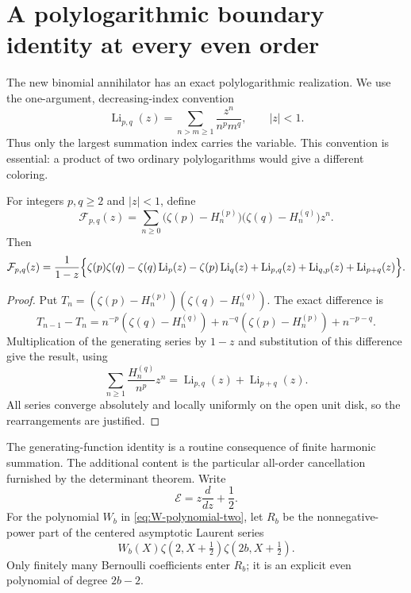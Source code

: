 \section{A polylogarithmic boundary identity at every even order}
\label{sec:polylog-companion}

The new binomial annihilator has an exact polylogarithmic realization.
We use the one-argument, decreasing-index convention
\[
 \operatorname{Li}_{p,q}(z)=\sum_{n>m\ge1}\frac{z^n}{n^p m^q},
 \qquad |z|<1.
\]
Thus only the largest summation index carries the variable. This
convention is essential: a product of two ordinary polylogarithms
would give a different coloring.

\begin{proposition}
\label{prop:two-tail-polylog}
For integers $p,q\ge2$ and $|z|<1$, define
\[
 \mathcal F_{p,q}(z)=\sum_{n\ge0}
       \bigl(\zeta(p)-H_n^{(p)}\bigr)
       \bigl(\zeta(q)-H_n^{(q)}\bigr)z^n.
\]
Then
\begin{equation}\label{eq:two-tail-polylog}
 \mathcal F_{p,q}(z)=\frac{1}{1-z}\Bigl\{
 \zeta(p)\zeta(q)-\zeta(q)\operatorname{Li}_p(z)
 -\zeta(p)\operatorname{Li}_q(z)
 +\operatorname{Li}_{p,q}(z)+\operatorname{Li}_{q,p}(z)
 +\operatorname{Li}_{p+q}(z)\Bigr\}.
\end{equation}
\end{proposition}
\begin{proof}
Put $T_n=(\zeta(p)-H_n^{(p)})(\zeta(q)-H_n^{(q)})$.
The exact difference is
\[
 T_{n-1}-T_n=n^{-p}(\zeta(q)-H_n^{(q)})
            +n^{-q}(\zeta(p)-H_n^{(p)})+n^{-p-q}.
\]
Multiplication of the generating series by $1-z$ and substitution
of this difference give the result, using
\[
 \sum_{n\ge1}\frac{H_n^{(q)}}{n^p}z^n
   =\operatorname{Li}_{p,q}(z)+\operatorname{Li}_{p+q}(z).
\]
All series converge absolutely and locally uniformly on the open
unit disk, so the rearrangements are justified.
\end{proof}

The generating-function identity is a routine consequence of finite
harmonic summation. The additional content is the particular
all-order cancellation furnished by the determinant theorem.
Write
\[
 \mathcal E=z\frac{d}{dz}+\frac12.
\]
For the polynomial $W_b$ in \eqref{eq:W-polynomial-two}, let
$R_b$ be the nonnegative-power part of the centered asymptotic
Laurent series
\begin{equation}\label{eq:polylog-subtraction}
 W_b(X)\zeta(2,X+\tfrac12)\zeta(2b,X+\tfrac12).
\end{equation}
Only finitely many Bernoulli coefficients enter $R_b$; it is an
explicit even polynomial of degree $2b-2$.


